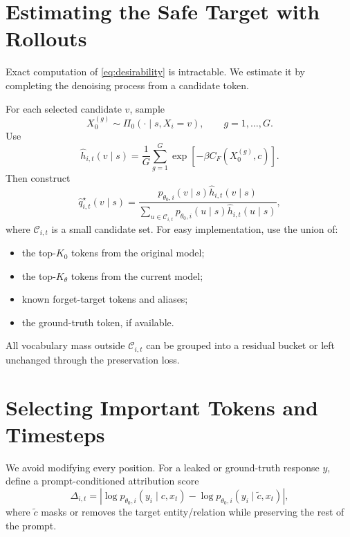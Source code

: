 \documentclass[10pt]{article}
\newcommand{\1}{\mathbb{I}}
\begin{document}
\section{Estimating the Safe Target with Rollouts}

Exact computation of \cref{eq:desirability} is intractable. We estimate it by completing the denoising process from a candidate token.

For each selected candidate $v$, sample
\begin{equation}
X_0^{(g)}\sim\Pi_0(\cdot\mid s,X_i=v),
\qquad g=1,\ldots,G.
\end{equation}
Use
\begin{equation}
\widehat h_{i,t}(v\mid s)
=
\frac{1}{G}\sum_{g=1}^{G}
\exp\left[-\beta C_F(X_0^{(g)},c)\right].
\label{eq:h_estimator}
\end{equation}
Then construct
\begin{equation}
\widehat q_{i,t}^\star(v\mid s)
=
\frac{
 p_{\theta_0,i}(v\mid s)\widehat h_{i,t}(v\mid s)
}{
 \sum_{u\in\mathcal C_{i,t}}
 p_{\theta_0,i}(u\mid s)\widehat h_{i,t}(u\mid s)
},
\label{eq:qhat}
\end{equation}
where $\mathcal C_{i,t}$ is a small candidate set. For easy implementation, use the union of:
\begin{itemize}[leftmargin=*]
    \item the top-$K_0$ tokens from the original model;
    \item the top-$K_\theta$ tokens from the current model;
    \item known forget-target tokens and aliases;
    \item the ground-truth token, if available.
\end{itemize}
All vocabulary mass outside $\mathcal C_{i,t}$ can be grouped into a residual bucket or left unchanged through the preservation loss.

\section{Selecting Important Tokens and Timesteps}

We avoid modifying every position. For a leaked or ground-truth response $y$, define a prompt-conditioned attribution score
\begin{equation}
\Delta_{i,t}
=
\left|
\log p_{\theta_0,i}(y_i\mid c,x_t)
-
\log p_{\theta_0,i}(y_i\mid \widetilde c,x_t)
\right|,
\label{eq:attribution}
\end{equation}
where $\widetilde c$ masks or removes the target entity/relation while preserving the rest of the prompt.
\end{document}
